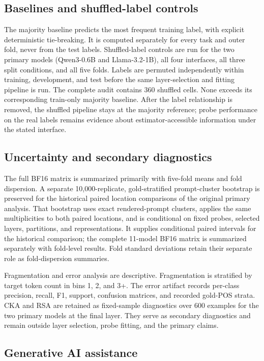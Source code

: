\documentclass[pdflatex,sn-basic]{sn-jnl}
\begin{document}
\subsection{Baselines and shuffled-label controls}

The majority baseline predicts the most frequent training label, with explicit
deterministic tie-breaking. It is computed separately for every task and
outer fold, never from the test labels. Shuffled-label controls are run for
the two primary models (Qwen3-0.6B and Llama-3.2-1B), all four interfaces, all three split
conditions, and all five folds. Labels are permuted independently within
training, development, and test before the same layer-selection and fitting
pipeline is run. The complete audit contains 360 shuffled cells. None exceeds
its corresponding train-only majority baseline. After the label relationship
is removed, the shuffled pipeline stays at the majority reference; probe
performance on the real labels remains evidence about estimator-accessible
information under the stated interface.

\subsection{Uncertainty and secondary diagnostics}

The full BF16 matrix is summarized primarily with five-fold means and fold
dispersion. A separate 10,000-replicate, gold-stratified prompt-cluster
bootstrap is preserved for the historical paired location comparisons of the
original primary analysis. That bootstrap uses exact rendered-prompt clusters,
applies the same multiplicities to both paired locations, and is conditional
on fixed probes, selected layers, partitions, and representations. It supplies
conditional paired intervals for the historical comparison; the complete
11-model BF16 matrix is summarized separately with fold-level results.
Fold standard deviations retain their separate role as fold-dispersion
summaries.

Fragmentation and error analysis are descriptive. Fragmentation is stratified
by target token count in bins 1, 2, and 3+. The error artifact records
per-class precision, recall, F1, support, confusion matrices, and recorded
gold-POS strata. CKA and RSA are retained as fixed-sample diagnostics over
600 examples for the two primary models at the final layer. They serve as
secondary diagnostics and remain outside layer selection, probe fitting, and
the primary claims.

\subsection{Generative AI assistance}
\end{document}
